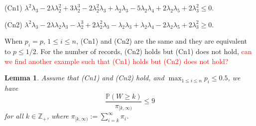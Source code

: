 \documentclass[12pt]{article}
\newtheorem{lma}[thm]{Lemma}
\newcommand{\Pro}{\mathbb{P}}
\newcommand{\prob}{\Pro}
\newcommand{\Z}{\mathbb{Z}}
\numberwithin{equation}{section}
\begin{document}
 \begin{description}
 \item{(Cn1)} $\lambda^2\lambda_3-2\lambda\lambda_2^2+3\lambda_2^3-2\lambda_2^2\lambda_3+\lambda_2\lambda_3-5\lambda_2\lambda_4+2\lambda_2\lambda_5+2\lambda_3^2\le 0.$
  \item{(Cn2)} $\lambda^2\lambda_3-2\lambda\lambda_2\lambda_3-\lambda_2^3+2\lambda_2^2\lambda_3-\lambda_2\lambda_3+\lambda_2\lambda_4-2\lambda_2\lambda_5+2\lambda_3^2\ge 0.$
 \end{description}
 
 When $p_i=p$, $1\le i\le n$, (Cn1) and (Cn2) are the same and they are equivalent to $p\le 1/2$. For the number of records, (Cn2) holds but (Cn1) does not hold, \textcolor{red}{ can we find another example such that (Cn1) holds but (Cn2) does not hold? }
 
 \begin{lma}\label{lma2} Assume that (Cn1) and (Cn2) hold, and $\max_{1\le i\le n}p_i\le0.5$, we have
 \begin{equation}\frac{\prob(W\ge k)}{\pi_{[k,\infty)}}\le 9\label{lma2-1}\end{equation}
 for all $k\in \Z_+$, where $\pi_{[k,\infty)}:=\sum_{i=k}^\infty \pi_i$.
 \end{lma}
\end{document}
